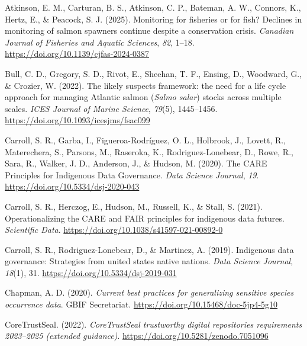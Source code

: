\documentclass[
  letterpaper,
  DIV=11,
  numbers=noendperiod]{scrartcl}
\newlength{\cslhangindent}
\newenvironment{CSLReferences}[2] %
 {\begin{list}{}{%
  \setlength{\itemindent}{0pt}
  \setlength{\leftmargin}{0pt}
  \setlength{\parsep}{0pt}
  \ifodd #1
   \setlength{\leftmargin}{\cslhangindent}
   \setlength{\itemindent}{-1\cslhangindent}
  \fi
  \setlength{\itemsep}{#2\baselineskip}}}
 {\end{list}}
\begin{document}
\label{refs}
\begin{CSLReferences}{1}{0}
Atkinson, E. M., Carturan, B. S., Atkinson, C. P., Bateman, A. W.,
Connors, K., Hertz, E., \& Peacock, S. J. (2025). Monitoring for
fisheries or for fish? Declines in monitoring of salmon spawners
continue despite a conservation crisis. \emph{Canadian Journal of
Fisheries and Aquatic Sciences}, \emph{82}, 1--18.
\url{https://doi.org/10.1139/cjfas-2024-0387}

Bull, C. D., Gregory, S. D., Rivot, E., Sheehan, T. F., Ensing, D.,
Woodward, G., \& Crozier, W. (2022). The likely suspects framework: the
need for a life cycle approach for managing Atlantic salmon
({\emph{Salmo salar}}) stocks across multiple scales. \emph{ICES Journal
of Marine Science}, \emph{79}(5), 1445--1456.
\url{https://doi.org/10.1093/icesjms/fsac099}

Carroll, S. R., Garba, I., Figueroa-Rodríguez, O. L., Holbrook, J.,
Lovett, R., Materechera, S., Parsons, M., Raseroka, K.,
Rodriguez-Lonebear, D., Rowe, R., Sara, R., Walker, J. D., Anderson, J.,
\& Hudson, M. (2020). The CARE Principles for Indigenous Data
Governance. \emph{Data Science Journal}, \emph{19}.
\url{https://doi.org/10.5334/dsj-2020-043}

Carroll, S. R., Herczog, E., Hudson, M., Russell, K., \& Stall, S.
(2021). Operationalizing the CARE and FAIR principles for indigenous
data futures. \emph{Scientific Data}.
\url{https://doi.org/10.1038/s41597-021-00892-0}

Carroll, S. R., Rodriguez-Lonebear, D., \& Martinez, A. (2019).
Indigenous data governance: Strategies from united states native
nations. \emph{Data Science Journal}, \emph{18}(1), 31.
\url{https://doi.org/10.5334/dsj-2019-031}

Chapman, A. D. (2020). \emph{Current best practices for generalizing
sensitive species occurrence data}. GBIF Secretariat.
\url{https://doi.org/10.15468/doc-5jp4-5g10}

CoreTrustSeal. (2022). \emph{CoreTrustSeal trustworthy digital
repositories requirements 2023--2025 (extended guidance)}.
\url{https://doi.org/10.5281/zenodo.7051096}


\end{CSLReferences}
\end{document}
